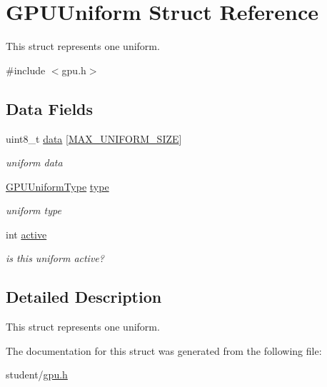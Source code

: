 \hypertarget{structGPUUniform}{}\section{G\+P\+U\+Uniform Struct Reference}
\label{structGPUUniform}


This struct represents one uniform.  




{\ttfamily \#include $<$gpu.\+h$>$}

\subsection*{Data Fields}
\begin{DoxyCompactItemize}
\item 
\mbox{\label{structGPUUniform_ac31d5501644276b7fb0850f3d219fbcb}} 
uint8\+\_\+t \hyperlink{structGPUUniform_ac31d5501644276b7fb0850f3d219fbcb}{data} \mbox{[}\hyperlink{gpu_8h_a3ac81405857dad64376c2b84d76fc3cf}{M\+A\+X\+\_\+\+U\+N\+I\+F\+O\+R\+M\+\_\+\+S\+I\+ZE}\mbox{]}
\begin{DoxyCompactList}\small\item\em uniform data \end{DoxyCompactList}\item 
\mbox{\label{structGPUUniform_acff779e71ac51bdf6849cc509cf45a4c}} 
\hyperlink{gpu_8h_a0a09a0e8bfa0704522ea2be08aabbd44}{G\+P\+U\+Uniform\+Type} \hyperlink{structGPUUniform_acff779e71ac51bdf6849cc509cf45a4c}{type}
\begin{DoxyCompactList}\small\item\em uniform type \end{DoxyCompactList}\item 
\mbox{\label{structGPUUniform_a9fd5ffcdae1a8d25bb4210db8c945cd4}} 
int \hyperlink{structGPUUniform_a9fd5ffcdae1a8d25bb4210db8c945cd4}{active}
\begin{DoxyCompactList}\small\item\em is this uniform active? \end{DoxyCompactList}\end{DoxyCompactItemize}


\subsection{Detailed Description}
This struct represents one uniform. 

The documentation for this struct was generated from the following file\+:\begin{DoxyCompactItemize}
\item 
student/\hyperlink{gpu_8h}{gpu.\+h}\end{DoxyCompactItemize}
